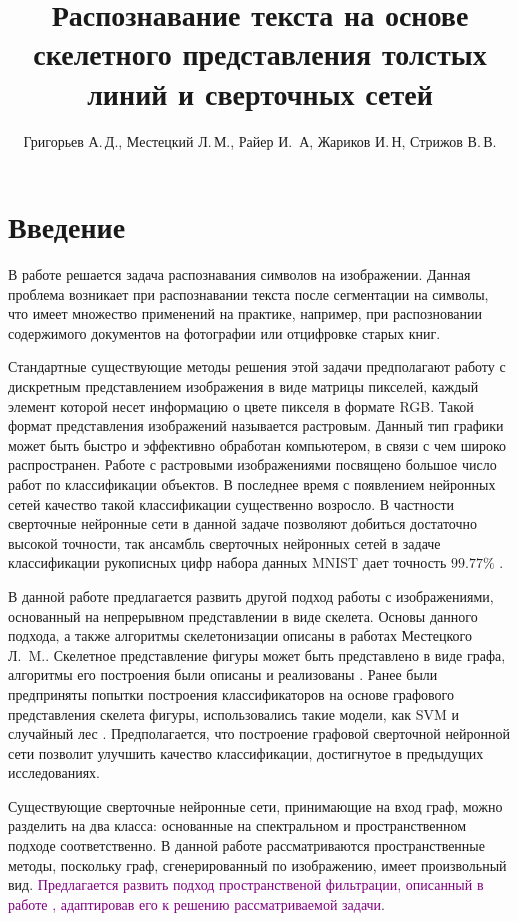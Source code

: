 \documentclass[12pt,twoside]{article}
\title
    [Распознавание текста на основе скелетного представления толстых линий и сверточных сетей] 
    {Распознавание текста на основе скелетного представления толстых линий и сверточных сетей}
\author
    [Григорьев А.\,Д., Местецкий Л.\,М., Райер И.\, А, Жариков И.\,Н, Стрижов В.\,В.] 
    {Григорьев А.\,Д., Местецкий Л.\,М., Райер И.\, А, Жариков И.\,Н, Стрижов В.\,В.}
    [Григорьев А.\,Д., Местецкий Л.\,М., Райер И.\, А, Жариков И.\,Н, Стрижов~В.\,В.]
\begin{document}
\maketitle
\section{Введение}
В работе решается задача распознавания символов на изображении. Данная проблема возникает при распознавании текста после сегментации на символы, что имеет множество применений на практике, например, при распозновании содержимого документов на фотографии или отцифровке старых книг.

Стандартные существующие методы решения этой задачи предполагают работу с дискретным представлением изображения в виде матрицы пикселей, каждый элемент которой несет информацию о цвете пикселя в формате RGB.  Такой формат представления изображений называется растровым. Данный тип графики может быть быстро и эффективно обработан компьютером, в связи с чем широко распространен. Работе с растровыми изображениями посвящено большое число работ по классификации объектов. В последнее время с появлением нейронных сетей качество такой классификации существенно возросло. В частности сверточные нейронные сети в данной задаче позволяют добиться достаточно высокой точности, так ансамбль сверточных нейронных сетей в задаче классификации  рукописных цифр набора данных MNIST дает точность $99.77\%$ \cite{conf/icdar/CiresanMGS11}.

В данной работе предлагается развить другой подход работы с изображениями, основанный на непрерывном представлении в виде скелета. Основы данного подхода, а также алгоритмы скелетонизации описаны в работах Местецкого Л.~M.\cite{mest2009, mest2006, mest2008}. Скелетное представление фигуры может быть представлено в виде графа, алгоритмы его построения были описаны и реализованы \cite{journals/corr/Fujita15, journals/corr/DirnbergerNK15, skan_lib}. Ранее были предприняты попытки построения классификаторов на основе графового представления скелета фигуры, использовались такие модели, как SVM и случайный лес \cite{Svm_cush, rf_msu}. Предполагается, что построение графовой сверточной нейронной сети позволит улучшить качество классификации, достигнутое в предыдущих исследованиях.

Существующие сверточные нейронные сети, принимающие на вход граф, можно разделить на два класса: основанные на спектральном и пространственном подходе соответственно. В данной работе рассматриваются пространственные методы, поскольку граф, сгенерированный по изображению, имеет произвольный вид. \textcolor{purple}{Предлагается развить подход пространственой фильтрации, описанный в работе \cite{rsf}, адаптировав его к решению рассматриваемой задачи}.
\end{document}

